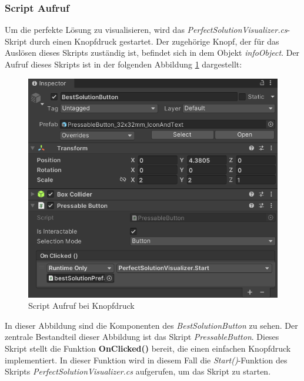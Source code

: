 \subsubsection{Script Aufruf}
Um die perfekte Lösung zu visualisieren, wird das \textit{PerfectSolutionVisualizer.cs}-Skript durch einen Knopfdruck
gestartet. Der zugehörige Knopf, der für das Auslösen dieses Skripts zuständig ist, befindet sich in dem Objekt
\textit{infoObject}. Der Aufruf dieses Skripts ist in der folgenden Abbildung \ref{fig:ScrAuf} dargestellt:
    \begin{figure}[h]
    \centering
    \includegraphics[scale=0.8]{images/perfSolBut}
    \caption{Script Aufruf bei Knopfdruck}
    \label{fig:ScrAuf}
\end{figure}
In dieser Abbildung sind die Komponenten des \textit{BestSolutionButton} zu sehen. Der zentrale Bestandteil dieser Abbildung
ist das Skript \textit{PressableButton}. Dieses Skript stellt die Funktion \textbf{OnClicked()} bereit, die einen einfachen
Knopfdruck implementiert. In dieser Funktion wird in diesem Fall die \textit{Start()}-Funktion des Skripts
\textit{PerfectSolutionVisualizer.cs} aufgerufen, um das Skript zu starten.

